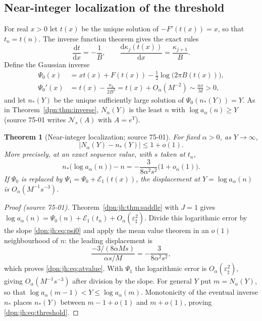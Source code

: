\documentclass[11pt]{article}
\numberwithin{equation}{section}
\newtheorem{theorem}{Theorem}[section]
\theoremstyle{definition}\newtheorem{definition}[theorem]{Definition}
\theoremstyle{remark}\newtheorem{remark}[theorem]{Remark}
\newcommand{\src}[1]{\textup{(source #1)}}
\newcommand{\epsh}{\varepsilon_{\sharp}}
\begin{document}
\subsection{Near-integer localization of the threshold}\label{dpn:jh:sec:threshold}
For real $x>0$ let $t(x)$ be the unique solution of $-F'(t(x))=x$, so that
$t_n=t(n)$.  The inverse function theorem gives the exact rules
\begin{equation}\label{dpn:jh:eq:xder}
 \frac{\mathrm dt}{\mathrm dx}=-\frac1B,\qquad
 \frac{\mathrm d\kappa_j(t(x))}{\mathrm dx}=\frac{\kappa_{j+1}}{B}.
\end{equation}
Define the Gaussian inverse
\begin{equation}\label{dpn:jh:eq:psi0}
\begin{aligned}
 \Psi_0(x)&=xt(x)+F(t(x))-\tfrac12\log\bigl(2\pi B(t(x))\bigr),\\
 \Psi_0'(x)&=t(x)-\frac{\kappa_3}{2B^2}
 =t(x)+O_\alpha(M^{-2})\sim\frac{\alpha s}{M}>0,
\end{aligned}
\end{equation}
and let $n_*(Y)$ be the unique sufficiently large solution of
$\Psi_0(n_*(Y))=Y$.  As in Theorem~\ref{dpn:thm:inverse}, $N_\alpha(Y)$ is the
least $n$ with $\log a_\alpha(n)\ge Y$ (source 75-01 writes
$\mathcal N_s(A)$ with $A=e^Y$).

\begin{theorem}[Near-integer localization; source 75-01]\label{dpn:jh:thm:threshold}
For fixed $\alpha>0$, as $Y\to\infty$,
\begin{equation}\label{dpn:jh:eq:threshold}
 |N_\alpha(Y)-n_*(Y)|\le1+o(1).
\end{equation}
More precisely, at an exact sequence value, with $s$ taken at $t_n$,
\begin{equation}\label{dpn:jh:eq:atvalue}
 n_*\bigl(\log a_\alpha(n)\bigr)-n=-\frac{3}{8\alpha^2s^2}\bigl(1+o_\alpha(1)\bigr).
\end{equation}
If $\Psi_0$ is replaced by $\Psi_1=\Psi_0+\mathcal E_1(t(x))$, the displacement
at $Y=\log a_\alpha(n)$ is $O_\alpha(M^{-1}s^{-3})$.
\end{theorem}
\begin{proof}[Proof \src{75-01}]
Theorem~\ref{dpn:jh:thm:saddle} with $J=1$ gives
$\log a_\alpha(n)=\Psi_0(n)+\mathcal E_1(t_n)+O_\alpha(\epsh^2)$.  Divide this
logarithmic error by the slope \eqref{dpn:jh:eq:psi0} and apply the mean value
theorem in an $o(1)$ neighbourhood of $n$: the leading displacement is
\[
 \frac{-3/(8\alpha Ms)}{\alpha s/M}=-\frac{3}{8\alpha^2s^2},
\]
which proves \eqref{dpn:jh:eq:atvalue}.  With $\Psi_1$ the logarithmic error is
$O_\alpha(\epsh^2)$, giving $O_\alpha(M^{-1}s^{-3})$ after division by the
slope.  For general $Y$ put $m=N_\alpha(Y)$, so that
$\log a_\alpha(m-1)<Y\le\log a_\alpha(m)$.  Monotonicity of the eventual
inverse $n_*$ places $n_*(Y)$ between $m-1+o(1)$ and $m+o(1)$, proving
\eqref{dpn:jh:eq:threshold}.
\end{proof}
\end{document}
